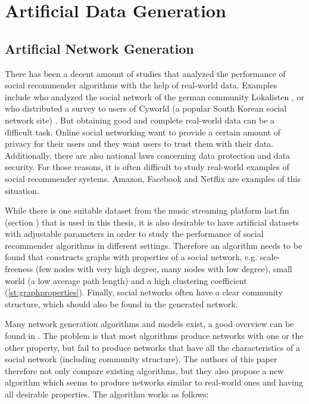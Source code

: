 \chapter{Artificial Data Generation}
\label{c:artificialdatageneration}
\section{Artificial Network Generation}
\label{st:artificialnetworkgeneration} There has been a decent amount of studies that analyzed the performance of social recommender algorithms with the help of real-world data. Examples include \cite{Groh_2007} who analyzed the social network of the german community Lokalisten \cite{Lokalisten}, or \cite{Liu_2010} who distributed a survey to users of Cyworld (a popular South Korean social network site) \cite{Cyworld}. But obtaining good and complete real-world data can be a difficult task. Online social networking want to provide a certain amount of privacy for their users and they want users to trust them with their data. Additionally, there are also national laws concerning data protection and data security. For those reasons, it is often difficult to study real-world examples of social recommender systems. Amazon, Facebook and Netflix are examples of this situation.

While there is one suitable dataset from the music streaming platform last.fm (section %
) that is used in this thesis, it is also desirable to have artificial datasets with adjustable parameters in order to study the performance of social recommender algorithms in different settings. Therefore an algorithm needs to be found that constructs graphs with properties of a social network, e.g. scale-freeness (few nodes with very high degree, many nodes with low degree), small world (a low average path length) and a high clustering coefficient (\ref{st:graphproperties}). Finally, social networks often have a clear community structure, which should also be found in the generated network.

Many network generation algorithms and models exist, a good overview can be found in \cite{Zaidi_2012}. The problem is that most algorithms produce networks with one or the other property, but fail to produce networks that have all the characteristics of a social network (including community structure). The authors of this paper therefore not only compare existing algorithms, but they also propose a new algorithm which seems to produce networks similar to real-world ones and having all desirable properties. The algorithm works as follows:

